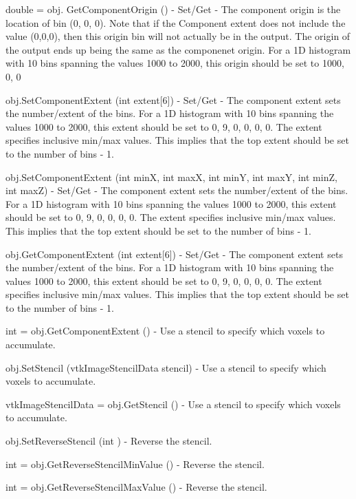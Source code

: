 \begin{DoxyItemize}
\item {\ttfamily double = obj. Get\-Component\-Origin ()} -\/ Set/\-Get -\/ The component origin is the location of bin (0, 0, 0). Note that if the Component extent does not include the value (0,0,0), then this origin bin will not actually be in the output. The origin of the output ends up being the same as the componenet origin. For a 1\-D histogram with 10 bins spanning the values 1000 to 2000, this origin should be set to 1000, 0, 0  
\item {\ttfamily obj.\-Set\-Component\-Extent (int extent\mbox{[}6\mbox{]})} -\/ Set/\-Get -\/ The component extent sets the number/extent of the bins. For a 1\-D histogram with 10 bins spanning the values 1000 to 2000, this extent should be set to 0, 9, 0, 0, 0, 0. The extent specifies inclusive min/max values. This implies that the top extent should be set to the number of bins -\/ 1.  
\item {\ttfamily obj.\-Set\-Component\-Extent (int min\-X, int max\-X, int min\-Y, int max\-Y, int min\-Z, int max\-Z)} -\/ Set/\-Get -\/ The component extent sets the number/extent of the bins. For a 1\-D histogram with 10 bins spanning the values 1000 to 2000, this extent should be set to 0, 9, 0, 0, 0, 0. The extent specifies inclusive min/max values. This implies that the top extent should be set to the number of bins -\/ 1.  
\item {\ttfamily obj.\-Get\-Component\-Extent (int extent\mbox{[}6\mbox{]})} -\/ Set/\-Get -\/ The component extent sets the number/extent of the bins. For a 1\-D histogram with 10 bins spanning the values 1000 to 2000, this extent should be set to 0, 9, 0, 0, 0, 0. The extent specifies inclusive min/max values. This implies that the top extent should be set to the number of bins -\/ 1.  
\item {\ttfamily int = obj.\-Get\-Component\-Extent ()} -\/ Use a stencil to specify which voxels to accumulate.  
\item {\ttfamily obj.\-Set\-Stencil (vtk\-Image\-Stencil\-Data stencil)} -\/ Use a stencil to specify which voxels to accumulate.  
\item {\ttfamily vtk\-Image\-Stencil\-Data = obj.\-Get\-Stencil ()} -\/ Use a stencil to specify which voxels to accumulate.  
\item {\ttfamily obj.\-Set\-Reverse\-Stencil (int )} -\/ Reverse the stencil.  
\item {\ttfamily int = obj.\-Get\-Reverse\-Stencil\-Min\-Value ()} -\/ Reverse the stencil.  
\item {\ttfamily int = obj.\-Get\-Reverse\-Stencil\-Max\-Value ()} -\/ Reverse the stencil.  

\end{DoxyItemize}

